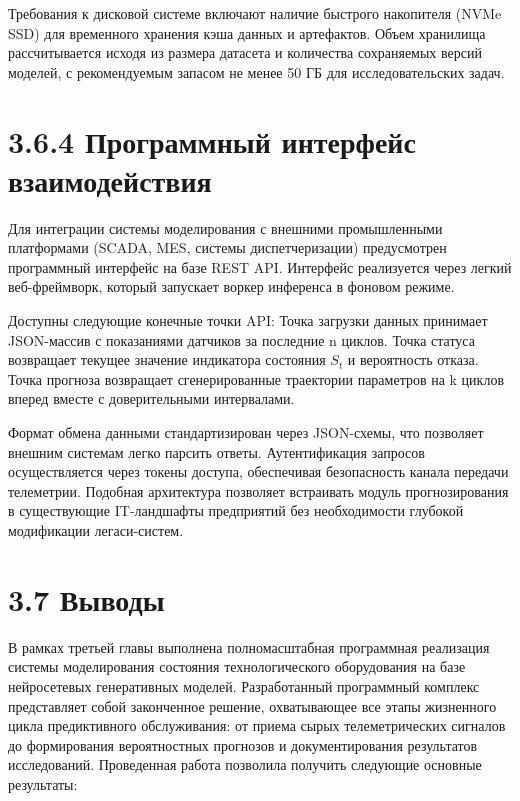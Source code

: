 \documentclass[14pt, a4paper, oneside]{extreport}
\begin{document}
Требования к дисковой системе включают наличие быстрого накопителя (NVMe SSD) для временного хранения кэша данных и артефактов. Объем хранилища рассчитывается исходя из размера датасета и количества сохраняемых версий моделей, с рекомендуемым запасом не менее 50 ГБ для исследовательских задач.

\section{3.6.4 Программный интерфейс взаимодействия}

Для интеграции системы моделирования с внешними промышленными платформами (SCADA, MES, системы диспетчеризации) предусмотрен программный интерфейс на базе REST API. Интерфейс реализуется через легкий веб-фреймворк, который запускает воркер инференса в фоновом режиме.

Доступны следующие конечные точки API:
Точка загрузки данных принимает JSON-массив с показаниями датчиков за последние n циклов.
Точка статуса возвращает текущее значение индикатора состояния $S_t$ и вероятность отказа.
Точка прогноза возвращает сгенерированные траектории параметров на k циклов вперед вместе с доверительными интервалами.

Формат обмена данными стандартизирован через JSON-схемы, что позволяет внешним системам легко парсить ответы. Аутентификация запросов осуществляется через токены доступа, обеспечивая безопасность канала передачи телеметрии. Подобная архитектура позволяет встраивать модуль прогнозирования в существующие IT-ландшафты предприятий без необходимости глубокой модификации легаси-систем.


\vspace{1em}
\section{3.7 Выводы}
\vspace{1em}

В рамках третьей главы выполнена полномасштабная программная реализация системы моделирования состояния технологического оборудования на базе нейросетевых генеративных моделей. Разработанный программный комплекс представляет собой законченное решение, охватывающее все этапы жизненного цикла предиктивного обслуживания: от приема сырых телеметрических сигналов до формирования вероятностных прогнозов и документирования результатов исследований. Проведенная работа позволила получить следующие основные результаты:
\end{document}
